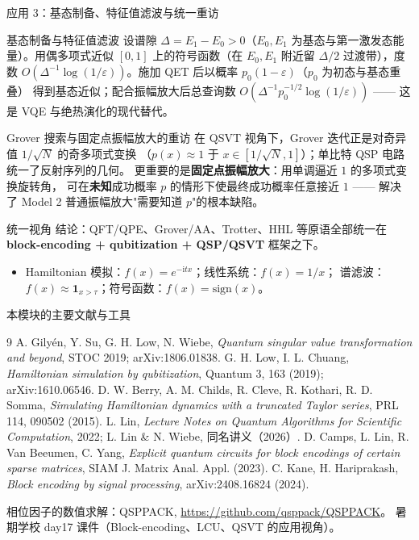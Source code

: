 \documentclass[aspectratio=169,9pt]{ctexbeamer}
\newcommand{\eps}{\varepsilon}
\newcommand{\ii}{\mathrm{i}}
\newcommand{\smallcite}[1]{\par\vspace{1.2mm}{\scriptsize\color{graytext}#1}}
\begin{document}
\begin{frame}{应用 3：基态制备、特征值滤波与统一重访}
\begin{keybox}{基态制备与特征值滤波}
设谱隙 $\Delta=E_1-E_0>0$（$E_0,E_1$ 为基态与第一激发态能量）。用偶多项式近似
$[0,1]$ 上的符号函数（在 $E_0,E_1$ 附近留 $\Delta/2$ 过渡带），度数
$O(\Delta^{-1}\log(1/\eps))$。施加 QET 后以概率 $p_0(1-\eps)$（$p_0$ 为初态与基态重叠）
得到基态近似；配合振幅放大后总查询数 $O(\Delta^{-1}p_0^{-1/2}\log(1/\eps))$
—— 这是 VQE 与绝热演化的现代替代。
\end{keybox}
\begin{keybox}{Grover 搜索与固定点振幅放大的重访}
在 QSVT 视角下，Grover 迭代正是对奇异值 $1/\sqrt N$ 的奇多项式变换
（$p(x)\approx1$ 于 $x\in[1/\sqrt N,1]$）；单比特 QSP 电路统一了反射序列的几何。
更重要的是\textbf{固定点振幅放大}：用单调逼近 $1$ 的多项式变换旋转角，
可在\textbf{未知}成功概率 $p$ 的情形下使最终成功概率任意接近 $1$
—— 解决了 Model 2 普通振幅放大"需要知道 $p$"的根本缺陷。
\end{keybox}
\begin{keybox}{统一视角}
{\small 结论：}QFT/QPE、Grover/AA、Trotter、HHL 等原语全部统一在
\textbf{block-encoding + qubitization + QSP/QSVT} 框架之下。
\begin{itemize}
\item Hamiltonian 模拟：$f(x)=e^{-\ii tx}$；线性系统：$f(x)=1/x$；
谱滤波：$f(x)\approx\mathbf 1_{x>\tau}$；符号函数：$f(x)=\mathrm{sign}(x)$。
\end{itemize}
\end{keybox}
\smallcite{Model 3 笔记第 8.3 节。}
\end{frame}

\begin{frame}{本模块的主要文献与工具}
\footnotesize
\begin{thebibliography}{9}
 A. Gily\'en, Y. Su, G. H. Low, N. Wiebe, \emph{Quantum singular value transformation and beyond}, STOC 2019; arXiv:1806.01838.
 G. H. Low, I. L. Chuang, \emph{Hamiltonian simulation by qubitization}, Quantum 3, 163 (2019); arXiv:1610.06546.
 D. W. Berry, A. M. Childs, R. Cleve, R. Kothari, R. D. Somma, \emph{Simulating Hamiltonian dynamics with a truncated Taylor series}, PRL 114, 090502 (2015).
 L. Lin, \emph{Lecture Notes on Quantum Algorithms for Scientific Computation}, 2022; L. Lin \& N. Wiebe, 同名讲义（2026）.
 D. Camps, L. Lin, R. Van Beeumen, C. Yang, \emph{Explicit quantum circuits for block encodings of certain sparse matrices}, SIAM J. Matrix Anal. Appl. (2023).
 C. Kane, H. Hariprakash, \emph{Block encoding by signal processing}, arXiv:2408.16824 (2024).
\end{thebibliography}
\vspace{1mm}
{\tiny\color{graytext}相位因子的数值求解：QSPPACK, \url{https://github.com/qsppack/QSPPACK}。
暑期学校 day17 课件（Block-encoding、LCU、QSVT 的应用视角）。}
\end{frame}
\end{document}

